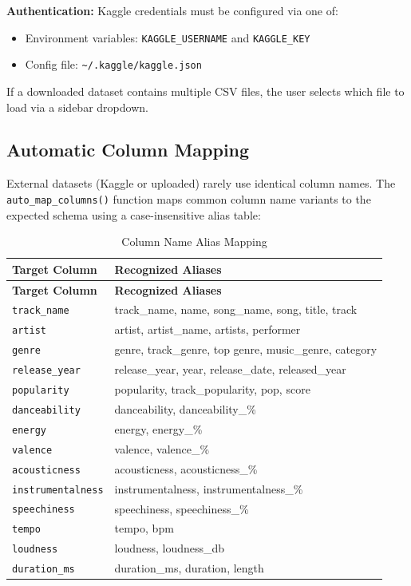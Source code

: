\documentclass[12pt,a4paper]{article}
\begin{document}
\textbf{Authentication:} Kaggle credentials must be configured via one of:
\begin{itemize}[noitemsep]
    \item Environment variables: \texttt{KAGGLE\_USERNAME} and \texttt{KAGGLE\_KEY}
    \item Config file: \texttt{\textasciitilde/.kaggle/kaggle.json}
\end{itemize}

If a downloaded dataset contains multiple CSV files, the user selects which file to load via a sidebar dropdown.

\subsection{Automatic Column Mapping}
\label{sec:column-mapping}

External datasets (Kaggle or uploaded) rarely use identical column names. The \texttt{auto\_map\_columns()} function maps common column name variants to the expected schema using a case-insensitive alias table:

\begin{longtable}{@{}lp{8cm}@{}}
\caption{Column Name Alias Mapping} \\
\toprule
\textbf{Target Column} & \textbf{Recognized Aliases} \\
\midrule
\endfirsthead
\toprule
\textbf{Target Column} & \textbf{Recognized Aliases} \\
\midrule
\endhead
\texttt{track\_name}      & track\_name, name, song\_name, song, title, track \\
\texttt{artist}           & artist, artist\_name, artists, performer \\
\texttt{genre}            & genre, track\_genre, top genre, music\_genre, category \\
\texttt{release\_year}    & release\_year, year, release\_date, released\_year \\
\texttt{popularity}       & popularity, track\_popularity, pop, score \\
\texttt{danceability}     & danceability, danceability\_\% \\
\texttt{energy}           & energy, energy\_\% \\
\texttt{valence}          & valence, valence\_\% \\
\texttt{acousticness}     & acousticness, acousticness\_\% \\
\texttt{instrumentalness} & instrumentalness, instrumentalness\_\% \\
\texttt{speechiness}      & speechiness, speechiness\_\% \\
\texttt{tempo}            & tempo, bpm \\
\texttt{loudness}         & loudness, loudness\_db \\
\texttt{duration\_ms}     & duration\_ms, duration, length \\
\bottomrule
\end{longtable}
\end{document}
